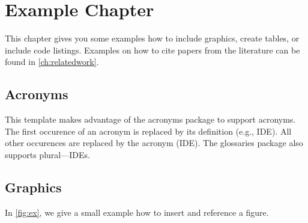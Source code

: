 \chapter{Example Chapter}\label{ch:implementation}

This chapter gives you some examples how to include graphics, create tables, or include code listings.
Examples on how to cite papers from the literature can be found in \autoref{ch:relatedwork}.

\section{Acronyms}

This template makes advantage of the acronyms package to support acronyms. The first occurence of an acronym is replaced by its definition (e.g., \ac{IDE}). All other occurences are replaced by the acronym (\ac{IDE}). The glossaries package also supports plural---\acp{IDE}.

\section{Graphics}

In \autoref{fig:ex}, we give a small example how to insert and reference a figure.

